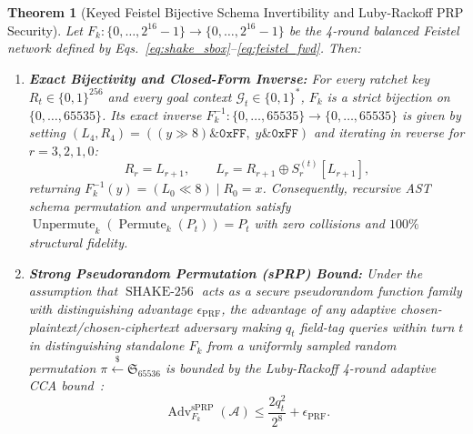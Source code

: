 \documentclass[conference,10pt]{IEEEtran}
\newtheorem{theorem}{Theorem}
\begin{document}
\begin{theorem}[Keyed Feistel Bijective Schema Invertibility and Luby-Rackoff PRP Security]
\label{thm:feistel}
Let $F_k: \{0,\dots,2^{16}-1\} \to \{0,\dots,2^{16}-1\}$ be the 4-round balanced Feistel network defined by Eqs.~\eqref{eq:shake_sbox}--\eqref{eq:feistel_fwd}. Then:
\begin{enumerate}
    \item \textbf{Exact Bijectivity and Closed-Form Inverse:} For every ratchet key $R_t \in \{0,1\}^{256}$ and every goal context $\mathcal{G}_t \in \{0,1\}^*$, $F_k$ is a strict bijection on $\{0,\dots,65535\}$. Its exact inverse $F_k^{-1}: \{0,\dots,65535\} \to \{0,\dots,65535\}$ is given by setting $(L_4, R_4) = ((y \gg 8) \mathbin{\&} \mathtt{0xFF},\; y \mathbin{\&} \mathtt{0xFF})$ and iterating in reverse for $r = 3, 2, 1, 0$:
    \begin{equation}
    \label{eq:feistel_inv}
    R_r = L_{r+1}, \qquad L_r = R_{r+1} \oplus S_r^{(t)}[L_{r+1}],
    \end{equation}
    returning $F_k^{-1}(y) = (L_0 \ll 8) \mid R_0 = x$. Consequently, recursive AST schema permutation and unpermutation satisfy $\operatorname{Unpermute}_k(\operatorname{Permute}_k(P_t)) = P_t$ with zero collisions and $100\%$ structural fidelity.
    \item \textbf{Strong Pseudorandom Permutation (sPRP) Bound:} Under the assumption that $\operatorname{SHAKE-256}$ acts as a secure pseudorandom function family with distinguishing advantage $\epsilon_{\text{PRF}}$, the advantage of any adaptive chosen-plaintext/chosen-ciphertext adversary making $q_t$ field-tag queries within turn $t$ in distinguishing standalone $F_k$ from a uniformly sampled random permutation $\pi \xleftarrow{\$} \mathfrak{S}_{65536}$ is bounded by the Luby-Rackoff 4-round adaptive CCA bound~\cite{luby1988construct, black2002ciphers}:
    \begin{equation}
    \label{eq:luby_rackoff}
    \operatorname{Adv}^{\text{sPRP}}_{F_k}(\mathcal{A}) \le \frac{2 q_t^2}{2^8} + \epsilon_{\text{PRF}}.
    \end{equation}
\end{enumerate}
\end{theorem}
\end{document}
